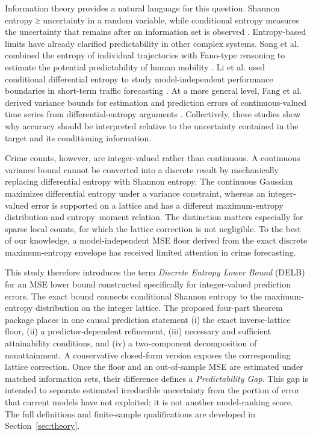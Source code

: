 \documentclass[applsci,article,submit,moreauthors]{Definitions/mdpi}
\begin{document}
Information theory provides a natural language for this question. Shannon
entropy ≥ uncertainty in a random variable, while conditional entropy
measures the uncertainty that remains after an information set is observed
\citep{shannon1948,cover_thomas}. Entropy-based limits have already clarified
predictability in other complex systems. Song et al. combined the entropy of
individual trajectories with Fano-type reasoning to estimate the potential
predictability of human mobility \citep{song2010limits}. Li et al. used
conditional differential entropy to study model-independent performance
boundaries in short-term traffic forecasting \citep{li2022traffic}. At a
more general level, Fang et al. derived variance bounds for estimation and
prediction errors of continuous-valued time series from differential-entropy
arguments \citep{fang_variance_bounds}. Collectively, these studies show why
accuracy should be interpreted relative to the uncertainty contained in the
target and its conditioning information.

Crime counts, however, are integer-valued rather than continuous. A
continuous variance bound cannot be converted into a discrete result by
mechanically replacing differential entropy with Shannon entropy. The
continuous Gaussian maximizes differential entropy under a variance
constraint, whereas an integer-valued error is supported on a lattice and
has a different maximum-entropy distribution and entropy--moment relation.
The distinction matters especially for sparse local counts, for which the
lattice correction is not negligible. To the best of our knowledge, a
model-independent MSE floor derived from the exact discrete maximum-entropy
envelope has received limited attention in crime forecasting.

This study therefore introduces the term \emph{Discrete Entropy Lower Bound}
(DELB) for an MSE lower bound constructed specifically for integer-valued
prediction errors. The exact bound connects conditional Shannon entropy to
the maximum-entropy distribution on the integer lattice. The proposed
four-part theorem package places in one causal prediction statement
(i) the exact inverse-lattice floor, (ii) a predictor-dependent refinement,
(iii) necessary and sufficient attainability conditions, and (iv) a
two-component decomposition of nonattainment. A conservative closed-form
version exposes the corresponding lattice correction. Once the floor and
an out-of-sample MSE are estimated under matched information sets, their
difference defines a \emph{Predictability Gap}. This gap is intended to
separate estimated irreducible uncertainty from the portion of error that
current models have not exploited; it is not another model-ranking score.
The full definitions and finite-sample qualifications are developed in
Section~\ref{sec:theory}.
\end{document}

